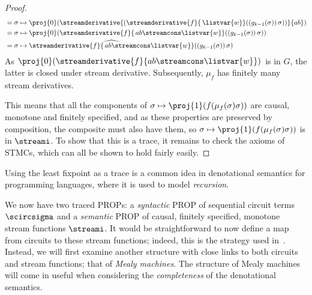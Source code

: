 \begin{proof}
\begin{align*}
         & = \sigma \mapsto \proj{0}\mleft(\streamderivative{\left(\streamderivative{f}{\, \listvar{w}}(\left(g_{k-1}(\sigma)\right)\sigma)\right)}{ab}\mright)    \\
         & = \sigma \mapsto \proj{0}\mleft(\streamderivative{f}{\, ab \streamcons \listvar{w}}(\left(g_{k-1}(\sigma)\right)\sigma)\mright)                         \\
         & = \sigma \mapsto \widehat{\streamderivative{f}{\, ab \streamcons \listvar{w}}}(\left(g_{k-1}(\sigma)\right)\sigma)
    \end{align*}
    As \(\proj{0}\mleft(\streamderivative{f}{ab \streamcons \listvar{w}}\mright)\)
    is in \(G\), the latter  is closed under stream derivative.
    Subsequently, \(\mu_f\) has finitely many stream derivatives.

    This means that all the components of
    \(\sigma \mapsto \proj{1}(f(\mu_f(\sigma)\sigma))\) are causal, monotone and
    finitely specified, and as these properties are preserved by composition,
    the composite must also have them, so
    \(\sigma \mapsto \proj{1}(f(\mu_f(\sigma)\sigma))\) is in \(\streami\).
    To show that this is a trace, it remains to check the axioms of STMCs,
    which can all be shown to hold fairly easily.
\end{proof}

\begin{remark}
    Using the least fixpoint as a trace is a common idea in
    denotational semantics for programming languages, where it is used to
    model \emph{recursion}.
\end{remark}

We now have two traced PROPs: a \emph{syntactic} PROP of sequential circuit
terms \(\scircsigma\) and a \emph{semantic} PROP of causal, finitely
specified, monotone stream functions \(\streami\).
It would be straightforward to now define a map from circuits to these stream
functions; indeed, this is the strategy used in~\cite{ghica2024fully}.
Instead, we will first examine another structure with close links to both
circuits and stream functions; that of \emph{Mealy machines}.
The structure of Mealy machines will come in useful when considering the
\emph{completeness} of the denotational semantics.